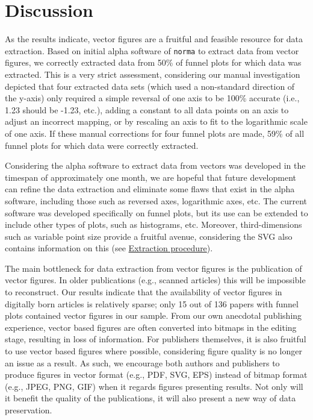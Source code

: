 \documentclass[a5paper]{book}
\begin{document}
\section{Discussion}\label{discussion-6}

As the results indicate, vector figures are a fruitful and feasible
resource for data extraction. Based on initial alpha software of
\texttt{norma} to extract data from vector figures, we correctly
extracted data from 50\% of funnel plots for which data was extracted.
This is a very strict assessment, considering our manual investigation
depicted that four extracted data sets (which used a non-standard
direction of the y-axis) only required a simple reversal of one axis to
be 100\% accurate (i.e., 1.23 should be -1.23, etc.), adding a constant
to all data points on an axis to adjust an incorrect mapping, or by
rescaling an axis to fit to the logarithmic scale of one axis. If these
manual corrections for four funnel plots are made, 59\% of all funnel
plots for which data were correctly extracted.

Considering the alpha software to extract data from vectors was
developed in the timespan of approximately one month, we are hopeful
that future development can refine the data extraction and eliminate
some flaws that exist in the alpha software, including those such as
reversed axes, logarithmic axes, etc. The current software was developed
specifically on funnel plots, but its use can be extended to include
other types of plots, such as histograms, etc. Moreover,
third-dimensions such as variable point size provide a fruitful avenue,
considering the SVG also contains information on this (see
\protect\hyperlink{extraction-procedure}{Extraction procedure}).

The main bottleneck for data extraction from vector figures is the
publication of vector figures. In older publications (e.g., scanned
articles) this will be impossible to reconstruct. Our results indicate
that the availability of vector figures in digitally born articles is
relatively sparse; only 15 out of 136 papers with funnel plots contained
vector figures in our sample. From our own anecdotal publishing
experience, vector based figures are often converted into bitmaps in the
editing stage, resulting in loss of information. For publishers
themselves, it is also fruitful to use vector based figures where
possible, considering figure quality is no longer an issue as a result.
As such, we encourage both authors and publishers to produce figures in
vector format (e.g., PDF, SVG, EPS) instead of bitmap format (e.g.,
JPEG, PNG, GIF) when it regards figures presenting results. Not only
will it benefit the quality of the publications, it will also present a
new way of data preservation.
\end{document}
